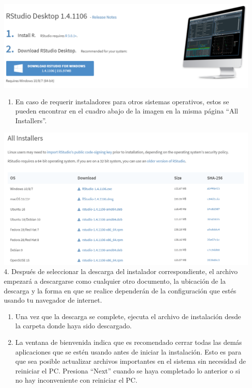 \documentclass[
]{book}
\providecommand{\tightlist}{%
  \setlength{\itemsep}{0pt}\setlength{\parskip}{0pt}}
\begin{document}
\includegraphics{data/R01.png}

\begin{enumerate}
\def\labelenumi{\arabic{enumi}.}
\setcounter{enumi}{2}
\tightlist
\item
  En caso de requerir instaladores para otros sistemas operativos, estos se pueden encontrar en el cuadro abajo de la imagen en la misma página ``All Installers''.
\end{enumerate}

\includegraphics{data/R02.png}
4. Después de seleccionar la descarga del instalador correspondiente, el archivo empezará a descargarse como cualquier otro documento, la ubicación de la descarga y la forma en que se realice dependerán de la configuración que estés usando tu navegador de internet.

\begin{enumerate}
\def\labelenumi{\arabic{enumi}.}
\setcounter{enumi}{4}
\item
  Una vez que la descarga se complete, ejecuta el archivo de instalación desde la carpeta donde haya sido descargado.
\item
  La ventana de bienvenida indica que es recomendado cerrar todas las demás aplicaciones que se estén usando antes de iniciar la instalación. Esto es para que sea posible actualizar archivos importantes en el sistema sin necesidad de reiniciar el PC. Presiona ``Next'' cuando se haya completado lo anterior o si no hay inconveniente con reiniciar el PC.
\end{enumerate}
\end{document}
